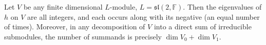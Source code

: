 Let $V$ be any finite dimensional $L$-module, $L = \mathfrak{sl}(2, \mathbb{F})$. Then the eigenvalues of $h$ on $V$ are all integers, and each occurs along with its negative (an equal number of times). Moreover, in any decomposition of $V$ into a direct sum of irreducible submodules, the number of summands is precisely $\dim V_0 + \dim V_1$.
